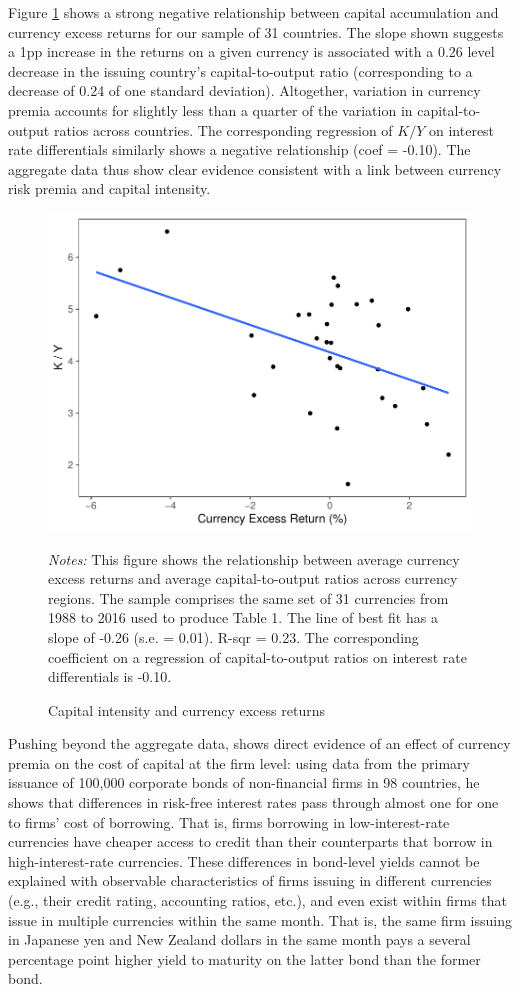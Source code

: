 \documentclass[11pt]{article}
\begin{document}
Figure \ref{fig:ky_rx} shows a strong negative relationship between capital accumulation and currency excess returns for our sample of 31 countries. The slope shown suggests a 1pp increase in the returns on a given currency is associated with a 0.26 level decrease in the issuing country's capital-to-output ratio (corresponding to a decrease of 0.24 of one standard deviation). Altogether, variation in currency premia accounts for slightly less than a quarter of the variation in capital-to-output ratios across countries. The corresponding regression of $K/Y$ on interest rate differentials similarly shows a negative relationship (coef = -0.10). The aggregate data thus show clear evidence consistent with a link between currency risk premia and capital intensity. 
\begin{figure}[htp]
    \centering
    \caption{Capital intensity and currency excess returns}
    \label{fig:ky_rx}
    \includegraphics[width=0.7\linewidth]{Exhibits/Figure_KY_RX.pdf}
    \begin{minipage}[htp]{\textwidth}
    \scriptsize 
    \emph{Notes:} This figure shows the relationship between average currency excess returns and average capital-to-output ratios across currency regions. The sample comprises the same set of 31 currencies from 1988 to 2016 used to produce Table 1. The line of best fit has a slope of -0.26 (s.e. = 0.01). R-sqr = 0.23. The corresponding coefficient on a regression of capital-to-output ratios on interest rate differentials is -0.10.
    \end{minipage}
\end{figure}

Pushing beyond the aggregate data, \citet{Richers2020} shows direct evidence of an effect of currency premia on the cost of capital at the firm level: using data from the primary issuance of 100,000 corporate bonds of non-financial firms in 98 countries, he shows that differences in risk-free interest rates pass through almost one for one to firms' cost of borrowing. That is, firms borrowing in low-interest-rate currencies have cheaper access to credit than their counterparts that borrow in high-interest-rate currencies. These differences in bond-level yields cannot be explained with observable characteristics of firms issuing in different currencies (e.g., their credit rating, accounting ratios, etc.), and even exist within firms that issue in multiple currencies within the same month. That is, the same firm issuing in Japanese yen and New Zealand dollars in the same month pays a several percentage point higher yield to maturity on the latter bond than the former bond.
\end{document}
